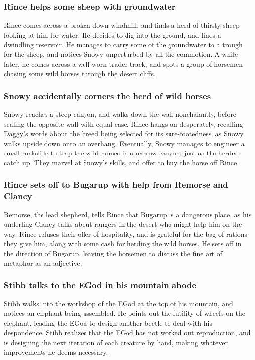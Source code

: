 \subsubsection{\Gls{Rince} helps some sheep with groundwater}
\Gls{Rince} comes across a broken-down windmill, and finds a herd of thirsty sheep looking at him
for water. He decides to dig into the ground, and finds a dwindling reservoir. He manages to carry
some of the groundwater to a trough for the sheep, and notices \Gls{Snowy} unperturbed by all the
commotion. A while later, he comes across a well-worn trader track, and spots a group of horsemen
chasing some wild horses through the desert cliffs.

\subsubsection{\Gls{Snowy} accidentally corners the herd of wild horses}
\Gls{Snowy} reaches a steep canyon, and walks down the wall nonchalantly, before scaling the
opposite wall with equal ease. \Gls{Rince} hangs on desperately, recalling \Gls{Daggy}'s words about
the breed being selected for its sure-footedness, as \Gls{Snowy} walks upside down onto an overhang.
Eventually, \Gls{Snowy} manages to engineer a small rockslide to trap the wild horses in a narrow
canyon, just as the herders catch up. They marvel at \Gls{Snowy}'s skills, and offer to buy the
horse off \Gls{Rince}.

\subsubsection{\Gls{Rince} sets off to Bugarup with help from \Gls{Remorse} and \Gls{Clancy}}
\Gls{Remorse}, the lead shepherd, tells \Gls{Rince} that Bugarup is a dangerous place, as his
underling \Gls{Clancy} talks about rangers in the desert who might help him on the way. \Gls{Rince}
refuses their offer of hospitality, and is grateful for the bag of rations they give him, along with
some cash for herding the wild horses. He sets off in the direction of Bugarup, leaving the
horsemen to discuss the fine art of metaphor as an adjective.

\subsubsection{\Gls{Stibb} talks to the \Gls{EGod} in his mountain abode}
\Gls{Stibb} walks into the workshop of the \Gls{EGod} at the top of his mountain, and notices an
elephant being assembled. He points out the futility of wheels on the elephant, leading the
\Gls{EGod} to design another beetle to deal with his despondence. \Gls{Stibb} realizes that the
\Gls{EGod} has not worked out reproduction, and is designing the next iteration of each creature by
hand, making whatever improvements he deems necessary.


